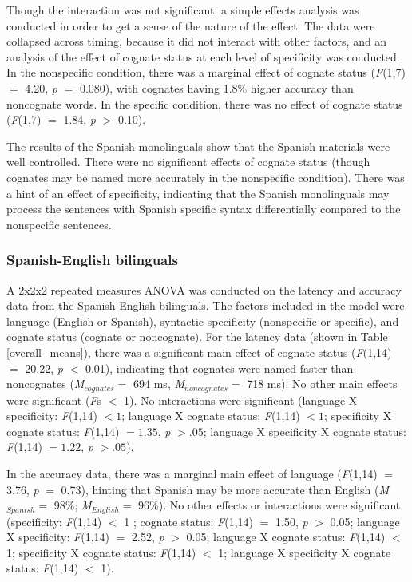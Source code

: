 Though the interaction was not significant, a simple effects analysis was conducted in order to get a sense of the nature of the effect. The data were collapsed across timing, because it did not interact with other factors, and an analysis of the effect of cognate status at each level of specificity was conducted. In the nonspecific condition, there was a marginal effect of cognate status (\textit{F}(1,7) $=$ 4.20, \textit{p} $=$ 0.080), with cognates having 1.8\% higher accuracy than noncognate words. In the specific condition, there was no effect of cognate status (\textit{F}(1,7) $=$ 1.84, \textit{p} $>$ 0.10).

The results of the Spanish monolinguals show that the Spanish materials were well controlled. There were no significant effects of cognate status (though cognates may be named more accurately in the nonspecific condition). There was a hint of an effect of specificity, indicating that the Spanish monolinguals may process the sentences with Spanish specific syntax differentially compared to the nonspecific sentences. 

\subsubsection{Spanish-English bilinguals}
A 2x2x2 repeated measures ANOVA was conducted on the latency and accuracy data from the Spanish-English bilinguals. The factors included in the model were language (English or Spanish), syntactic specificity (nonspecific or specific), and cognate status (cognate or noncognate). For the latency data (shown in Table \ref{overall_means}), there was a significant main effect of cognate status (\textit{F}(1,14) $=$ 20.22, \textit{p} $<$ 0.01), indicating that cognates were named faster than noncognates (\textit{M}$_{cognates} =$ 694 ms, \textit{M}$_{noncognates} =$ 718 ms). No other main effects were significant (\textit{F}s $<$ 1). No interactions were significant (language X specificity: \textit{F}(1,14) $< 1$; language X cognate status: \textit{F}(1,14) $< 1$; specificity X cognate status: \textit{F}(1,14) $= 1.35$, \textit{p} $> .05$; language X specificity X cognate status: \textit{F}(1,14) $= 1.22$, \textit{p} $> .05$). 



In the accuracy data, there was a marginal main effect of language (\textit{F}(1,14) $=$ 3.76, \textit{p} $=$ 0.73), hinting that Spanish may be more accurate than English (\textit{M}$_{Spanish} =$ 98\%; \textit{M}$_{English} =$ 96\%). No other effects or interactions were significant (specificity: \textit{F}(1,14) $<$ 1 ; cognate status: \textit{F}(1,14) $=$ 1.50, \textit{p} $>$ 0.05; language X specificity: \textit{F}(1,14) $=$ 2.52, \textit{p} $>$ 0.05; language X cognate status: \textit{F}(1,14) $<$ 1; specificity X cognate status: \textit{F}(1,14) $<$ 1; language X specificity X cognate status: \textit{F}(1,14) $<$ 1). 

